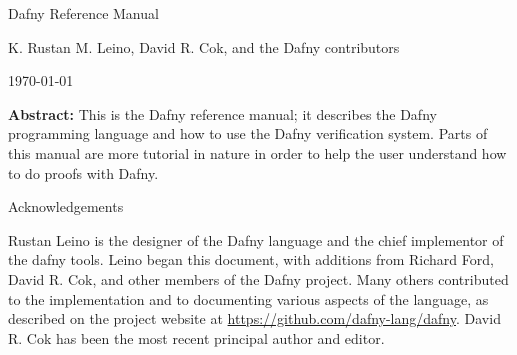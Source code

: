 \begin{center}\Huge Dafny Reference Manual\end{center}
\begin{center}K. Rustan M. Leino, David R. Cok, and the Dafny contributors\end{center}
\begin{center}\today\end{center}
\vspace{1in}
\textbf{Abstract:} This is the Dafny reference manual; it  describes the Dafny programming
language and how to use the Dafny verification system.
Parts of this manual are more tutorial in nature in order to help the
user understand how to do proofs with Dafny.

\vspace{1in}
\begin{center}\Large Acknowledgements\end{center}
Rustan Leino is the designer of the Dafny language and the chief implementor of the dafny tools. 
Leino began this document, with additions from Richard Ford, David R. Cok,  and other members of the Dafny project.
Many others contributed to the implementation and to documenting various aspects of the language, as described on the project website at \url{https://github.com/dafny-lang/dafny}.
David R. Cok has been the most recent principal author and editor.
\newpage
